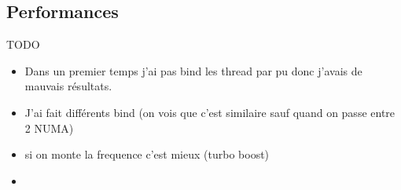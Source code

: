\subsection{Performances}

TODO

\begin{itemize}
  \item Dans un premier temps j'ai pas bind les thread par pu donc j'avais de mauvais résultats.
  \item J'ai fait différents bind (on vois que c'est similaire sauf quand on passe entre 2 NUMA)
  \item si on monte la frequence c'est mieux (turbo boost)
  \item 
\end{itemize}

